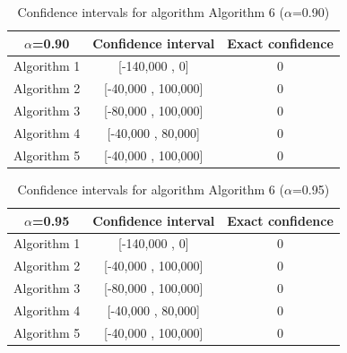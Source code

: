 \documentclass[a4paper,10pt]{article}
\begin{document}
\begin{table}[!htp]
\centering\small
\begin{tabular}{
|c|c|c|}
\hline
 $\alpha$=0.90 & Confidence interval & Exact confidence \\ \hline 
Algorithm 1 & [-140,000 , 0] & 0\\ \hline 
Algorithm 2 & [-40,000 , 100,000] & 0\\ \hline 
Algorithm 3 & [-80,000 , 100,000] & 0\\ \hline 
Algorithm 4 & [-40,000 , 80,000] & 0\\ \hline 
Algorithm 5 & [-40,000 , 100,000] & 0\\ \hline 

\end{tabular}
\caption{Confidence intervals for algorithm Algorithm 6 ($\alpha$=0.90)}
\end{table}
\begin{table}[!htp]
\centering\small
\begin{tabular}{
|c|c|c|}
\hline
 $\alpha$=0.95 & Confidence interval & Exact confidence \\ \hline 
Algorithm 1 & [-140,000 , 0] & 0\\ \hline 
Algorithm 2 & [-40,000 , 100,000] & 0\\ \hline 
Algorithm 3 & [-80,000 , 100,000] & 0\\ \hline 
Algorithm 4 & [-40,000 , 80,000] & 0\\ \hline 
Algorithm 5 & [-40,000 , 100,000] & 0\\ \hline 

\end{tabular}
\caption{Confidence intervals for algorithm Algorithm 6 ($\alpha$=0.95)}
\end{table}

 \clearpage 
\end{document}

